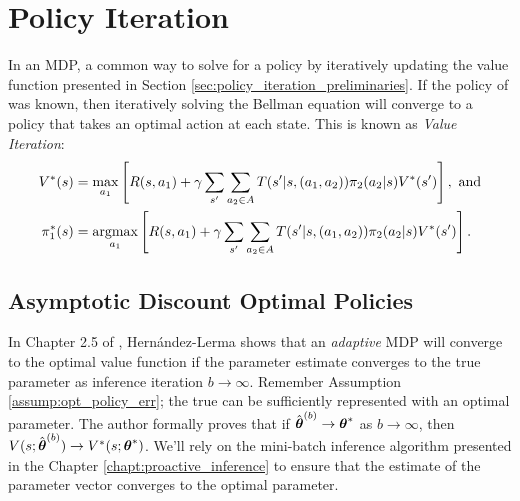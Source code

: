 \chapter{Policy Iteration}\label{chapt:policy_iteration}

    In an \ac{MDP}, a common way to solve for a policy by iteratively updating the value function presented in Section
    \ref{sec:policy_iteration_preliminaries}. If the policy of  was known, then iteratively solving the Bellman
    equation \cite{something} will converge to a policy that takes an optimal action at each state. This is known as
    \textit{Value Iteration}:
    \begin{equation}\label{eq:bellman_true}
        \begin{aligned}
                V^*(s) &= \max_{a_1}\left[R(s,a_1) +
                    \gamma\sum_{s'}\sum_{a_2\in A}T(s'|s,(a_1,a_2))\pi_{2}(a_2|s) V^*(s')\right],\ \text{and}\\
                \pi_{1}^*(s) &= \mathop{\mathrm{argmax}}_{a_1}\left[R(s,a_1) +
                    \gamma\sum_{s'}\sum_{a_2\in A}T(s'|s,(a_1,a_2))\pi_{2}(a_2|s)V^*(s')\right].
        \end{aligned}
    \end{equation}

\section{Asymptotic Discount Optimal Policies}\label{sec:ADO_policy}

    In Chapter 2.5 of \cite{hernandez2012adaptive}, Hern\'andez-Lerma shows that an \textit{adaptive}  \ac{MDP} will
    converge to the optimal value function if the parameter estimate converges to the true parameter as inference
    iteration $b\rightarrow \infty$. Remember Assumption \ref{assump:opt_policy_err}; the true  can be
    sufficiently represented with an optimal parameter.  The author formally proves that if $\hat{\boldsymbol{\mathbb{\theta}}}^{(b)}
    \rightarrow \boldsymbol{\mathbb{\theta}}^*$ as $b \rightarrow \infty$, then $V(s;\hat{\boldsymbol{\mathbb{\theta}}}^{(b)}) \rightarrow
    V^*(s;\boldsymbol{\mathbb{\theta}}^*)$.  We'll rely on the mini-batch inference algorithm presented in the Chapter
    \ref{chapt:proactive_inference} to ensure that the estimate of the parameter vector converges to the optimal
    parameter.

